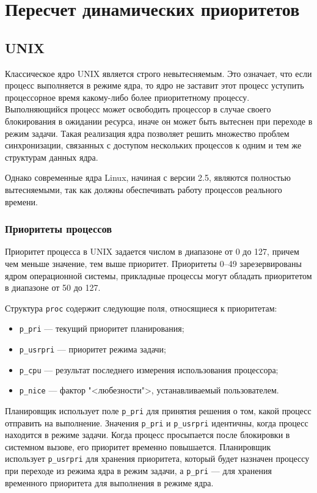 \documentclass[a4paper,oneside,14pt]{extreport}
\newcommand{\code}[1]{\texttt{#1}}
\begin{document}
\chapter{Пересчет динамических приоритетов}

\section{UNIX}

Классическое ядро UNIX является строго невытесняемым. Это означает, что если процесс выполняется в режиме ядра, то ядро не заставит этот процесс уступить процессорное время какому-либо более приоритетному процессу. Выполняющийся процесс может освободить процессор в случае своего блокирования в ожидании ресурса, иначе он может быть вытеснен при переходе в режим задачи. Такая реализация ядра позволяет решить множество проблем синхронизации, связанных с доступом нескольких процессов к одним и тем же структурам данных ядра.

Однако современные ядра Linux, начиная с версии 2.5, являются полностью вытесняемыми, так как должны обеспечивать работу процессов реального времени.

\subsection{Приоритеты процессов}

Приоритет процесса в UNIX задается числом в диапазоне от 0 до 127, причем чем меньше значение, тем выше приоритет. Приоритеты 0--49 зарезервированы ядром операционной системы, прикладные процессы могут обладать приоритетом в диапазоне от 50 до 127.

Структура \code{proc} содержит следующие поля, относящиеся к приоритетам:
\begin{itemize}
	\item \code{p{\_}pri} --- текущий приоритет планирования;
	\item \code{p{\_}usrpri} --- приоритет режима задачи;
	\item \code{p{\_}cpu} --- результат последнего измерения использования процессора;
	\item \code{p{\_}nice} --- фактор "<любезности">, устанавливаемый пользователем.
\end{itemize}

Планировщик использует поле \code{p{\_}pri} для принятия решения о том, какой процесс отправить на выполнение. Значения \code{p{\_}pri} и \code{p{\_}usrpri} идентичны, когда процесс находится в режиме задачи. Когда процесс просыпается после блокировки в системном вызове, его приоритет временно повышается. Планировщик использует \code{p{\_}usrpri} для хранения приоритета, который будет назначен процессу при переходе из режима ядра в режим задачи, а \code{p{\_}pri} --- для хранения временного приоритета для выполнения в режиме ядра.
\end{document}
